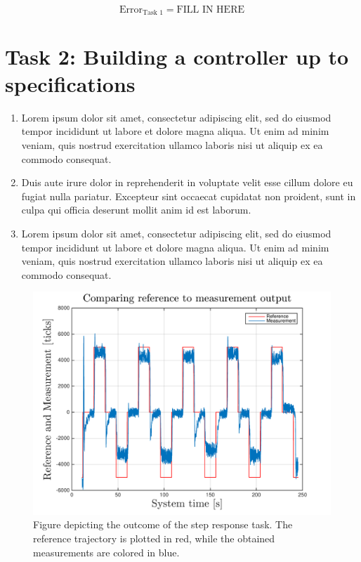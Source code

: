 \documentclass[12pt,a4paper,twocolumn]{article}
\begin{document}
\begin{equation*}
\text{Error}_{\text{Task 1}} = \text{FILL IN HERE}
\end{equation*}



\section*{Task 2: Building a controller up to specifications}
\label{s:task_2}

\begin{enumerate}[label=\alph*)]
\item Lorem ipsum dolor sit amet, consectetur adipiscing elit, sed do eiusmod tempor incididunt ut labore et dolore magna aliqua. Ut enim ad minim veniam, quis nostrud exercitation ullamco laboris nisi ut aliquip ex ea commodo consequat. 

\item Duis aute irure dolor in reprehenderit in voluptate velit esse cillum dolore eu fugiat nulla pariatur. Excepteur sint occaecat cupidatat non proident, sunt in culpa qui officia deserunt mollit anim id est laborum.

\item Lorem ipsum dolor sit amet, consectetur adipiscing elit, sed do eiusmod tempor incididunt ut labore et dolore magna aliqua. Ut enim ad minim veniam, quis nostrud exercitation ullamco laboris nisi ut aliquip ex ea commodo consequat. 
\end{enumerate}



\begin{figure}[ht]
\centering
\includegraphics[width=.95\linewidth]{figures/seesaw_measurement_task2_fig1}
\caption[Measure1]{\label{f:measure1} Figure depicting the outcome of the step response task. The reference trajectory is plotted in red, while the obtained measurements are colored in blue.}
\label{fig:seesaw_task2_fig1}
\end{figure}
\end{document}
